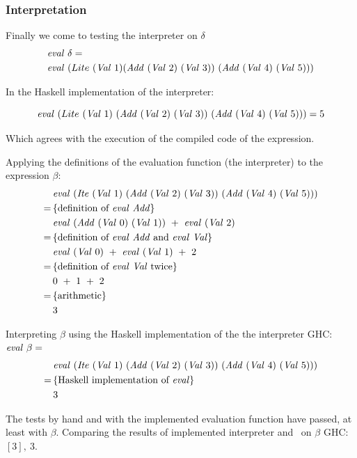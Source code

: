 \documentclass {article}
\begin{document}
\subsubsection{Interpretation}

Finally we come to testing the interpreter on $\delta$
\begin{align*}
&\evalf \delta  = \\
&\evalf (Lite\ (\Val 1) 
		(\Add (\Val 2)\ (\Val 3))\ 
		(\Add (\Val 4)\ (\Val 5))) \\
\end{align*}

In the Haskell implementation of the
interpreter:

\[ \evalf  (Lite\ (\Val 1)\ (\Add (\Val 2)\ (\Val 3))\ (\Add (\Val 4)\ (\Val 5)))  = 5\]


Which agrees with the execution of the 
compiled code of the expression.

Applying the definitions of the evaluation function (the interpreter) to the expression $\beta$:
\begin{align*}
	&\evalf  (\Ite (\Val 1)\ 
	(\Add (\Val 2)\ (\Val 3))\ (\Add (\Val 4)\ (\Val 5))) \\
	=\, & \{ \mbox{definition of \eval\ \add} \} \\
	&\evalf  (\Add (\Val 0)\ (\Val 1))\ +\ \evalf  (\Val 2) \\
	=\, & \{ \mbox{definition of \eval\ \add\ and \eval\ \val} \} \\
	&\evalf  (\Val 0)\ +\ \evalf  (\Val 1)\ +\ 2 \\
	=\, & \{ \mbox{definition of \eval\ \val\ twice} \} \\
	&0\ +\ 1\ +\ 2 \\
	=\, & \{ \mbox{arithmetic} \} \\
	&3
\end{align*}

Interpreting $\beta$ 
using the Haskell implementation of the the interpreter
GHC: \( \mathit{eval\ } \beta = \)
\begin{align*}
&\evalf (\Ite (\Val 1)\ 
	(\Add (\Val 2)\ (\Val 3))\ (\Add (\Val 4)\ (\Val 5))) \\
=\, & \{ \mbox{Haskell implementation of \eval} \} \\
&3
\end{align*}

The tests by hand and with the implemented evaluation function
have passed, at least with $\beta$.
Comparing the results of  
implemented interpreter and \vm\ on $\beta$
GHC: \( [3],\ 3 \).
\end{document}
